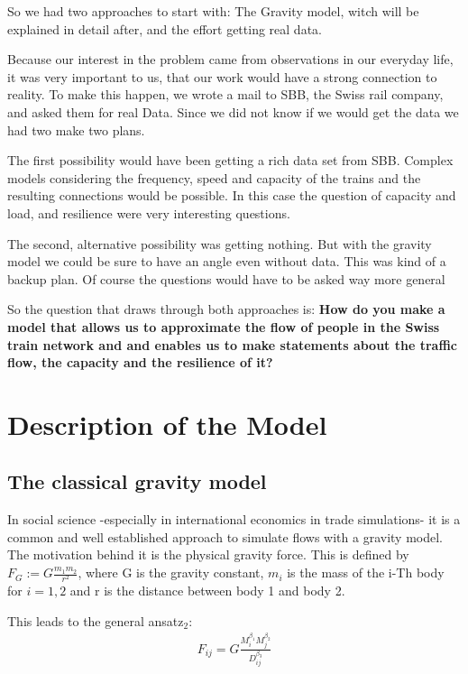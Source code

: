 \documentclass[11pt]{article}
\begin{document}
So we had two approaches to start with: The Gravity model, witch will be explained in detail after, and the effort getting real data.

Because our interest in the problem came from observations in our everyday life, it was very important to us, that our work would have a strong connection to reality. To make this happen, we wrote a mail to SBB, the Swiss rail company, and asked them for real Data. Since we did not know if we would get the data we had two make two plans.

The first possibility would have been getting a rich data set from SBB. Complex models considering the frequency, speed and capacity of the trains and the resulting connections would be possible. In this case the question of capacity and load, and resilience were very interesting questions.

The second, alternative possibility was getting nothing. But with the gravity model we could be sure to have an angle even  without data. This was kind of a backup plan. Of course the questions would have to be asked way more general  

So the question that draws through both approaches is:\newline 
\textbf{How do you make a model that allows us to approximate the flow of people in the Swiss train network and and enables us to make statements about the traffic flow, the capacity and the resilience of it?}    


\section{Description of the Model}
\subsection{The classical gravity model}
In  social science -especially in international economics in trade simulations- it is a common and well established approach to simulate flows with a gravity model. The motivation behind it is the physical gravity force. This is defined by $F_G:=G\frac{m_1 m_2}{r^2}$, where G is the gravity constant, $m_i$ is the mass of the  i-Th body for $i=1,2$ and r is the distance between body 1 and body 2.


This leads to the general ansatz$_2$:
\begin{align*}
F_{ij}=G\frac{M_i^{\beta_1}M_j^{\beta_2}}{D_{ij}^{\beta_3}}
\end{align*}
\end{document}
